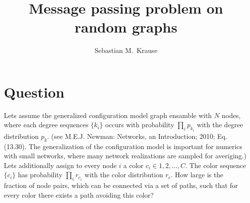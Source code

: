 \documentclass[aps, pre, onecolumn, a4paper, floatfix]{revtex4}
\begin{document}
\title{Message passing problem on random graphs}
\author{Sebastian M.\ Krause}
\affiliation{}
\begin{abstract}

\end{abstract}
\maketitle

\section*{Question}

Lets assume the generalized configuration model graph ensamble with $N$ nodes, 
where each degree sequences $\{k_i\}$ occurs with probability $\prod_i p_{k_i}$ 
with the degree distribution $p_{k}$. 
(see M.E.J. Newman: Networks, an Introduction; 2010; Eq. (13.30). The generalization 
of the configuration model is important for numerics with small networks, where 
many network realizations are sampled for averiging.) Lets additionally assign to 
every node $i$ a color $c_i\in 1,2,\dots,C$. The color sequence $\{c_i\}$ has 
probability $\prod_i r_{c_i}$ with the color distribution $r_c$. 
How large is the fraction of node pairs, which can be connected via a set of  
paths, such that for every color there exists a path avoiding this color? 
\end{document}
